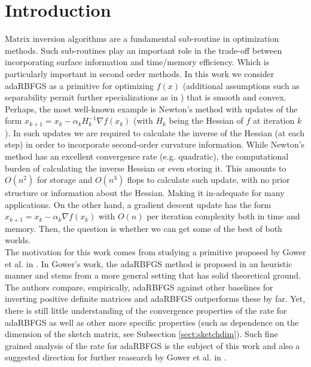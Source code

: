\documentclass[12pt,conference,compsocconf]{IEEEtran}
\begin{document}
\section{Introduction}
Matrix inversion algorithms are a fundamental sub-routine in optimization methods. Such sub-routines play an important role in the trade-off between incorporating surface information and time/memory efficiency. Which is particularly important in second order methods. In this work we consider adaRBFGS as a primitive for optimizing $f(x)$ (additional assumptions such as separability permit further specializations as in \cite{Gower2}) that is smooth and convex. Perhaps, the most well-known example is Newton's method with updates of the form $x_{k+1}=x_k-\alpha_kH_k^{-1}\nabla f(x_k)$ (with $H_k$ being the Hessian of $f$ at iteration $k$). In such updates we are required to calculate the inverse of the Hessian (at each step) in order to incorporate second-order curvature information. While Newton's method has an excellent convergence rate (e.g. quadratic), the computational burden of calculating the inverse Hessian or even storing it. This amounts to $O(n^2)$ for storage and $O(n^3)$ flops to calculate such update, with no prior structure or information about the Hessian. Making it in-adequate for many applications. On the other hand, a gradient descent update has the form $x_{k+1}=x_k-\alpha_k\nabla f(x_k)$ with $O(n)$ per iteration complexity both in time and memory. Then, the question is whether we can get some of the best of both worlds.\\
The motivation for this work comes from studying a primitive proposed by Gower et al. in \cite{Gower1}. In Gower's work, the adaRBFGS method is proposed in an heuristic manner and stems from a more general setting that has solid theoretical ground. The authors compare, empirically, adaRBFGS against other baselines for inverting positive definite matrices and adaRBFGS outperforms these by far. Yet, there is still little understanding of the convergence properties of the rate for adaRBFGS as well as other more specific properties (such as dependence on the dimension of the sketch matrix, see Subsection \ref{sect:sketchdim}). Such fine grained analysis of the rate for adaRBFGS is the subject of this work and also a suggested direction for further reasearch by Gower et al. in \cite{Gower1}.
\end{document}
